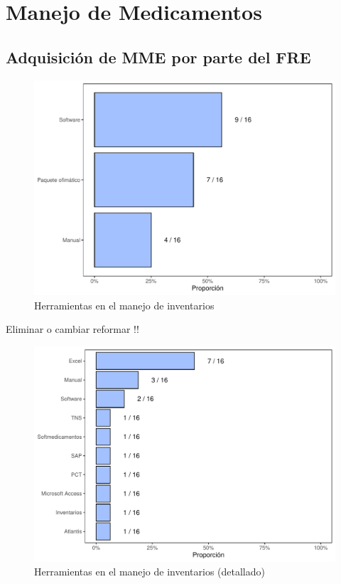 \documentclass[
]{book}
\begin{document}
\hypertarget{manejo-de-medicamentos}{%
\chapter{Manejo de Medicamentos}\label{manejo-de-medicamentos}}


\hypertarget{adquisiciuxf3n-de-mme-por-parte-del-fre}{%
\section{Adquisición de MME por parte del FRE}\label{adquisiciuxf3n-de-mme-por-parte-del-fre}}


\begin{figure}
\includegraphics[width=0.85\linewidth]{InformeFinal_files/figure-latex/HerramientasManejoInventarios-1} \caption{Herramientas en el manejo de inventarios}\label{fig:HerramientasManejoInventarios}
\end{figure}

Eliminar o cambiar reformar !!

\begin{figure}
\includegraphics[width=0.85\linewidth]{InformeFinal_files/figure-latex/HerramientasManejoInventarios1-1} \caption{Herramientas en el manejo de inventarios (detallado)}\label{fig:HerramientasManejoInventarios1}
\end{figure}
\end{document}

